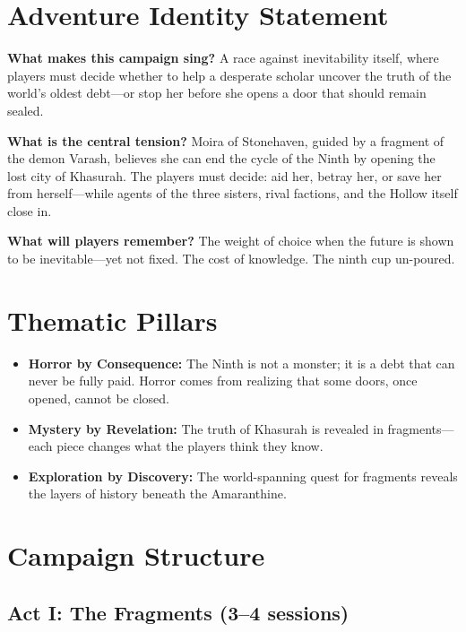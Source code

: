 \documentclass[11pt]{article}
\begin{document}




\tableofcontents
\newpage


\section{Adventure Identity Statement}

\textbf{What makes this campaign sing?} A race against inevitability itself, where players must decide whether to help a desperate scholar uncover the truth of the world's oldest debt---or stop her before she opens a door that should remain sealed.

\textbf{What is the central tension?} Moira of Stonehaven, guided by a fragment of the demon Varash, believes she can end the cycle of the Ninth by opening the lost city of Khasurah. The players must decide: aid her, betray her, or save her from herself---while agents of the three sisters, rival factions, and the Hollow itself close in.

\textbf{What will players remember?} The weight of choice when the future is shown to be inevitable---yet not fixed. The cost of knowledge. The ninth cup un-poured.

\section{Thematic Pillars}

\begin{itemize}
    \item \textbf{Horror by Consequence:} The Ninth is not a monster; it is a debt that can never be fully paid. Horror comes from realizing that some doors, once opened, cannot be closed.
    \item \textbf{Mystery by Revelation:} The truth of Khasurah is revealed in fragments---each piece changes what the players think they know.
    \item \textbf{Exploration by Discovery:} The world-spanning quest for fragments reveals the layers of history beneath the Amaranthine.
\end{itemize}

\section{Campaign Structure}

\subsection{Act I: The Fragments (3--4 sessions)}
\end{document}

